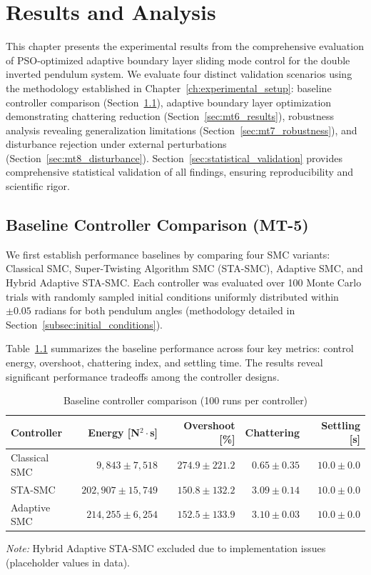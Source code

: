 \chapter{Results and Analysis}
\label{ch:results_analysis}

This chapter presents the experimental results from the comprehensive evaluation of PSO-optimized adaptive boundary layer sliding mode control for the double inverted pendulum system. We evaluate four distinct validation scenarios using the methodology established in Chapter~\ref{ch:experimental_setup}: baseline controller comparison (Section~\ref{sec:baseline_comparison}), adaptive boundary layer optimization demonstrating chattering reduction (Section~\ref{sec:mt6_results}), robustness analysis revealing generalization limitations (Section~\ref{sec:mt7_robustness}), and disturbance rejection under external perturbations (Section~\ref{sec:mt8_disturbance}). Section~\ref{sec:statistical_validation} provides comprehensive statistical validation of all findings, ensuring reproducibility and scientific rigor.

\section{Baseline Controller Comparison (MT-5)}
\label{sec:baseline_comparison}

We first establish performance baselines by comparing four SMC variants: Classical SMC, Super-Twisting Algorithm SMC (STA-SMC), Adaptive SMC, and Hybrid Adaptive STA-SMC. Each controller was evaluated over 100 Monte Carlo trials with randomly sampled initial conditions uniformly distributed within $\pm 0.05$ radians for both pendulum angles (methodology detailed in Section~\ref{subsec:initial_conditions}).

Table~\ref{tab:baseline_comparison} summarizes the baseline performance across four key metrics: control energy, overshoot, chattering index, and settling time. The results reveal significant performance tradeoffs among the controller designs.

\begin{table}[t]
\centering
\caption{Baseline controller comparison (100 runs per controller)}
\label{tab:baseline_comparison}
\begin{tabular}{lrrrr}
\toprule
\textbf{Controller} & \textbf{Energy [N$^2 \cdot$s]} & \textbf{Overshoot [\%]} & \textbf{Chattering} & \textbf{Settling [s]} \\
\midrule
Classical SMC & $9,843 \pm 7,518$ & $274.9 \pm 221.2$ & $0.65 \pm 0.35$ & $10.0 \pm 0.0$ \\
STA-SMC & $202,907 \pm 15,749$ & $150.8 \pm 132.2$ & $3.09 \pm 0.14$ & $10.0 \pm 0.0$ \\
Adaptive SMC & $214,255 \pm 6,254$ & $152.5 \pm 133.9$ & $3.10 \pm 0.03$ & $10.0 \pm 0.0$ \\
\bottomrule
\end{tabular}
\parbox{\textwidth}{\footnotesize \textit{Note:} Hybrid Adaptive STA-SMC excluded due to implementation issues (placeholder values in data).}
\end{table}

